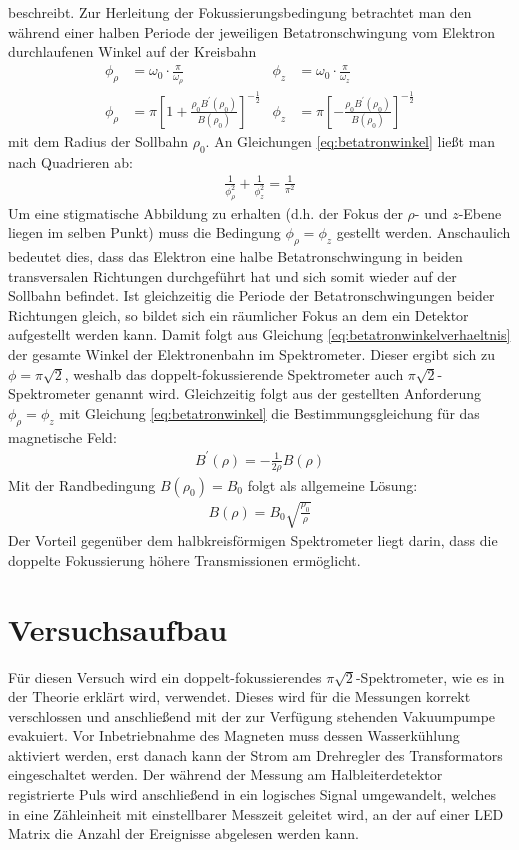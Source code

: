 \documentclass[11pt, a4paper]{article}
\numberwithin{equation}{section}
\begin{document}
beschreibt.
Zur Herleitung der Fokussierungsbedingung betrachtet man den während einer halben Periode der jeweiligen Betatronschwingung vom Elektron durchlaufenen Winkel auf der Kreisbahn
\begin{align}
	\phi_\rho &= \omega_0 \cdot \frac{\pi}{\omega_\rho} & \phi_z &= \omega_0 \cdot \frac{\pi}{\omega_z}\\
	\phi_\rho &= \pi \left[ 1+ \frac{\rho_0 B^\prime(\rho_0)}{B(\rho_0)} \right]^{-\frac{1}{2}} & \phi_z &= \pi \left[ -\frac{\rho_0 B^\prime(\rho_0)}{B(\rho_0)} \right]^{-\frac{1}{2}} \label{eq:betatronwinkel}
\end{align}
mit dem Radius der Sollbahn $\rho_0$.
An Gleichungen \eqref{eq:betatronwinkel} ließt man nach Quadrieren ab:
\begin{align}
	\frac{1}{\phi_\rho^2} + \frac{1}{\phi_z^2} = \frac{1}{\pi^2} \label{eq:betatronwinkelverhaeltnis}
\end{align}
Um eine stigmatische Abbildung zu erhalten (d.h. der Fokus der $\rho$- und $z$-Ebene liegen im selben Punkt) muss die Bedingung $\phi_\rho = \phi_z$ gestellt werden.
Anschaulich bedeutet dies, dass das Elektron eine halbe Betatronschwingung in beiden transversalen Richtungen durchgeführt hat und sich somit wieder auf der Sollbahn befindet.
Ist gleichzeitig die Periode der Betatronschwingungen beider Richtungen gleich, so bildet sich ein räumlicher Fokus an dem ein Detektor aufgestellt werden kann.
Damit folgt aus Gleichung \eqref{eq:betatronwinkelverhaeltnis} der gesamte Winkel der Elektronenbahn im Spektrometer.
Dieser ergibt sich zu $\phi = \pi \sqrt{2}$, weshalb das doppelt-fokussierende Spektrometer auch $\pi \sqrt{2}$-Spektrometer genannt wird.
Gleichzeitig folgt aus der gestellten Anforderung $\phi_\rho = \phi_z$ mit Gleichung \eqref{eq:betatronwinkel} die Bestimmungsgleichung für das magnetische Feld\cite{siegbahn}:
\begin{align}
	B^\prime(\rho) = - \frac{1}{2 \rho} B(\rho)
\end{align}
Mit der Randbedingung $B(\rho_0) = B_0$ folgt als allgemeine Lösung:
\begin{align}
	B(\rho) = B_0 \sqrt{\frac{\rho_0}{\rho}}
\end{align}
Der Vorteil gegenüber dem halbkreisförmigen Spektrometer liegt darin, dass die doppelte Fokussierung höhere Transmissionen ermöglicht.

\section{Versuchsaufbau}
Für diesen Versuch wird ein doppelt-fokussierendes $\pi\sqrt{2}$-Spektrometer, wie es in der Theorie erklärt wird, verwendet.
Dieses wird für die Messungen korrekt verschlossen und anschließend mit der zur Verfügung stehenden Vakuumpumpe evakuiert.
Vor Inbetriebnahme des Magneten muss dessen Wasserkühlung aktiviert werden, erst danach kann der Strom am Drehregler des Transformators eingeschaltet werden.
Der während der Messung am Halbleiterdetektor registrierte Puls wird anschließend in ein logisches Signal umgewandelt, welches in eine Zähleinheit mit einstellbarer Messzeit geleitet wird, an der auf einer LED Matrix die Anzahl der Ereignisse abgelesen werden kann.
\end{document}
